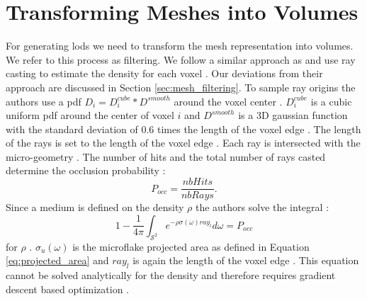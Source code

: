 \section{Transforming Meshes into Volumes}
\label{sec:transforming_meshes_into_volumes}
For generating \acp{lod} we need to transform the mesh representation into volumes.
We refer to this process as filtering.
We follow a similar approach as \citeauthor{hybrid_mesh_volume_lods} and use ray casting to estimate the density for each voxel \cite{hybrid_mesh_volume_lods}.
Our deviations from their approach are discussed in Section \ref{sec:mesh_filtering}.
To sample ray origins the authors use a \ac{pdf} $D_i=D_i^{cube} \ast D^{smooth}$ around the voxel center \cite{hybrid_mesh_volume_lods}.
$D_i^{cube}$ is a cubic uniform \ac{pdf} around the center of voxel $i$ and $D^{smooth}$ is a 3D gaussian function with the standard deviation of 0.6 times the length of the voxel edge \cite{hybrid_mesh_volume_lods}.
The length of the rays is set to the length of the voxel edge \cite{hybrid_mesh_volume_lods}.
Each ray is intersected with the micro-geometry \cite{hybrid_mesh_volume_lods}.
The number of hits and the total number of rays casted determine the occlusion probability \cite{hybrid_mesh_volume_lods}:
\begin{equation*}
    P_{occ}=\frac{nbHits}{nbRays}.
\end{equation*}
Since a medium is defined on the density $\rho$ the authors solve the integral \cite{hybrid_mesh_volume_lods}:
\begin{equation}
    1 - \frac{1}{4\pi}\int_{\mathcal{S}^2} e^{-\rho\sigma(\omega)ray_l} d\omega = P_{occ}
    \label{eq:loubet_filtering_equation}
\end{equation}
for $\rho$ \cite{hybrid_mesh_volume_lods}.
$\sigma_u(\omega)$ is the microflake projected area as defined in Equation \ref{eq:projected_area} and $ray_l$ is again the length of the voxel edge \cite{hybrid_mesh_volume_lods}.
This equation cannot be solved analytically for the density and therefore requires gradient descent based optimization \cite{hybrid_mesh_volume_lods}.





